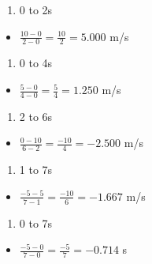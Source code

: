 \documentclass[
  letterpaper,
  DIV=11,
  numbers=noendperiod]{scrartcl}
\providecommand{\tightlist}{%
  \setlength{\itemsep}{0pt}\setlength{\parskip}{0pt}}\usepackage{longtable,booktabs,array}
\begin{document}
\begin{enumerate}
\def\labelenumi{(\alph{enumi})}
\tightlist
\item
  0 to 2s
\end{enumerate}

\begin{itemize}
\tightlist
\item
  \(\frac{10-0}{2-0} = \frac{10}{2} = 5.000\) m/s
\end{itemize}

\begin{enumerate}
\def\labelenumi{(\alph{enumi})}
\setcounter{enumi}{1}
\tightlist
\item
  0 to 4s
\end{enumerate}

\begin{itemize}
\tightlist
\item
  \(\frac{5-0}{4-0}=\frac{5}{4}=1.250\) m/s
\end{itemize}

\begin{enumerate}
\def\labelenumi{(\alph{enumi})}
\setcounter{enumi}{2}
\tightlist
\item
  2 to 6s
\end{enumerate}

\begin{itemize}
\tightlist
\item
  \(\frac{0-10}{6-2}=\frac{-10}{4}=-2.500\) m/s
\end{itemize}

\begin{enumerate}
\def\labelenumi{(\alph{enumi})}
\setcounter{enumi}{3}
\tightlist
\item
  1 to 7s
\end{enumerate}

\begin{itemize}
\tightlist
\item
  \(\frac{-5-5}{7-1}=\frac{-10}{6}=-1.667\) m/s
\end{itemize}

\begin{enumerate}
\def\labelenumi{(\alph{enumi})}
\setcounter{enumi}{4}
\tightlist
\item
  0 to 7s
\end{enumerate}

\begin{itemize}
\tightlist
\item
  \(\frac{-5-0}{7-0}=\frac{-5}{7}=-0.714\) s
\end{itemize}
\end{document}
